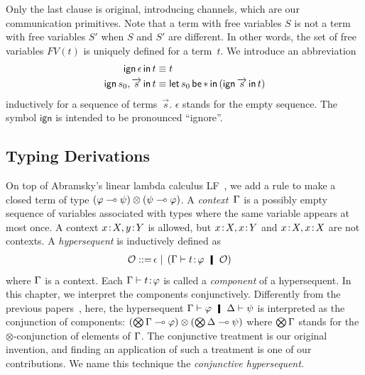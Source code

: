 Only the last clause is original,
introducing channels, which are our communication primitives.
Note that a term with free variables $S$ is not a term with free
variables $S'$ when $S$ and $S'$ are different.
In other words, the set of free variables $FV(t)$ is uniquely defined
for a term~$t$.
We introduce an abbreviation
\begin{align*}
 \mathsf{ign }\,{\epsilon}\,\mathsf{ in }\,{t}   & \equiv t\\
 \mathsf{ign }\,{s_0,\overrightarrow s}\,\mathsf{ in }\,{t} & \equiv \mathsf{let }\,{s_0}\,\mathsf{ be }\,{\ast}\,\mathsf{ in }\,{(\mathsf{ign }\,{\overrightarrow s}\,\mathsf{ in }\,{t})}
\end{align*}
inductively for a sequence of terms~$\vec s$.
$\epsilon$ stands for the empty sequence.
The symbol $\mathsf{ign}$ is intended to be pronounced ``ignore''.

\subsection{Typing Derivations}

On top of Abramsky's linear lambda calculus
LF~\citep{abramsky1993computational}, we add a rule to
make a closed term of type $(\varphi\multimap\psi)\otimes(\psi\multimap\varphi)$.
A \textit{context}~$\Gamma$ is a possibly empty sequence of
variables associated with
types where the same variable appears at most once.
A context ${x} \mathord{\colon\kern -2pt}{X}, {y} \mathord{\colon\kern -2pt}{Y}$ is allowed, but ${x} \mathord{\colon\kern -2pt}{X}, {x} \mathord{\colon\kern -2pt}{Y}$
and ${x} \mathord{\colon\kern -2pt}{X},{x} \mathord{\colon\kern -2pt}{X}$ are not contexts.
A \textit{hypersequent} is inductively defined as
\begin{align*}
 \hypert ::=\, & \epsilon
 \mid\, (\G\tr\tj{t}{\phi}\hmid \hypert)
\end{align*}
where $\Gamma$ is a context.
Each $\Gamma\vdash{t} \mathord{\colon\kern -2pt}{\varphi}$ is called a \textit{component}
of a hypersequent.
In this chapter, we interpret the components conjunctively.
Differently from the previous
papers~\citep{avron91,Baaz01122003,avrontableau,avron96},
here, the hypersequent $\G\tr\phi\hmid \D\tr\psi$ is interpreted as the
conjunction of components:
$(\bigotimes\Gamma\multimap\varphi)\otimes (\bigotimes\Delta\multimap\psi)$ where
$\bigotimes\Gamma$ stands for the $\otimes$-conjunction of elements of $\Gamma$.
The conjunctive treatment is our original invention, and finding an application
of such a treatment is one of our contributions.
We name this technique the \textit{conjunctive
hypersequent}.

